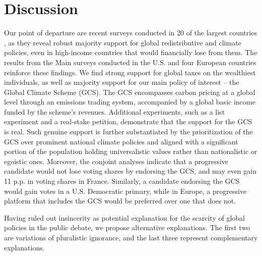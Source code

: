 \section{Discussion} %
Our point of departure are recent surveys conducted %
in 20 of the largest countries%
, as they reveal robust majority support for global redistributive and climate policies, even in high-income countries that would financially lose from them. The results from the Main surveys conducted in the U.S. and four European countries %
reinforce these findings. We find strong support for global taxes on the wealthiest individuals, as well as majority support for our main policy of interest -- the Global Climate Scheme (GCS). The GCS encompasses carbon pricing at a global level through an emissions trading system, accompanied by a global basic income funded by the scheme's revenues. Additional experiments, such as a list experiment and a real-stake petition, demonstrate that the support for the GCS is real. 
Such genuine support is further substantiated by the prioritization of the GCS over prominent national climate policies and aligned with a significant portion of the population holding universalistic values rather than nationalistic or egoistic ones. Moreover, the conjoint analyses indicate that a progressive candidate would not lose voting shares by endorsing the GCS, and may even gain 11 p.p. in voting shares in France. Similarly, a candidate endorsing the GCS would gain votes in a U.S. Democratic primary, while in Europe, a progressive platform that includes the GCS would be preferred over one that does not.

Having ruled out insincerity %
as potential explanation for the scarcity of global policies in the public debate, we propose alternative explanations. %
The first two are variations of pluralistic ignorance, and the last three represent complementary explanations. 


